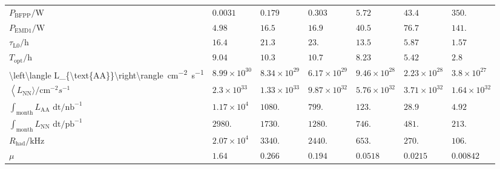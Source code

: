 \begin{tabular}{|*{1}{*{7}{|l}|}|}
$P_{\text{BFPP}}\text{/W}$                                                     &  \(0.0031\) & \(0.179\) & \(0.303\) & \(5.72\) & \(43.4\) & \(350.\) \\
$P_{\text{EMD1}}\text{/W}$                                                     &  \(4.98\) & \(16.5\) & \(16.9\) & \(40.5\) & \(76.7\) & \(141.\) \\
$\tau _{\text{L0}}\text{/h}$                                                   &  \(16.4\) & \(21.3\) & \(23.\) & \(13.5\) & \(5.87\) & \(1.57\) \\
$T_{\text{opt}}\text{/h}$                                                      &  \(9.04\) & \(10.3\) & \(10.7\) & \(8.23\) & \(5.42\) & \(2.8\) \\
\qty{\left\langle L_{\text{AA}}\right\rangle}{cm^{-2}s^{-1}}             &  \(8.99\times 10^{30}\) & \(8.34\times 10^{29}\) & \(6.17\times 10^{29}\) & \(9.46\times 10^{28}\) & \(2.23\times 10^{28}\) & \(3.8\times 10^{27}\) \\
$\left\langle L_{\text{NN}}\text{$\rangle $/}\text{cm}^{-2}s^{-1}\right.$      &  \(2.3\times 10^{33}\) & \(1.33\times 10^{33}\) & \(9.87\times 10^{32}\) & \(5.76\times 10^{32}\) & \(3.71\times 10^{32}\) & \(1.64\times 10^{32}\) \\
$\int _{\text{month}}L_{\text{AA}}\text{ dt/}\text{nb}^{-1}$                   &  \(1.17\times 10^4\) & \(1080.\) & \(799.\) & \(123.\) & \(28.9\) & \(4.92\) \\
$\int _{\text{month}}L_{\text{NN}}\text{ dt/}\text{pb}^{-1}$                   &  \(2980.\) & \(1730.\) & \(1280.\) & \(746.\) & \(481.\) & \(213.\) \\
$R_{\text{had}}\text{/kHz}$                                                    &  \(2.07\times 10^4\) & \(3340.\) & \(2440.\) & \(653.\) & \(270.\) & \(106.\) \\
$\mu$                                                                          &  \(1.64\) & \(0.266\) & \(0.194\) & \(0.0518\) & \(0.0215\) & \(0.00842\) \\
\end{tabular}
